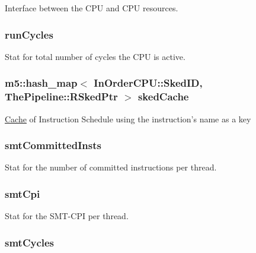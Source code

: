 \label{classInOrderCPU_a2979f0f9689d1d8615cacdc85c65e11f}
Interface between the CPU and CPU resources. \hypertarget{classInOrderCPU_af9addd340a133c2f4add363a3055b019}{
\subsubsection[{runCycles}]{ {\bf runCycles}}}
\label{classInOrderCPU_af9addd340a133c2f4add363a3055b019}
Stat for total number of cycles the CPU is active. \hypertarget{classInOrderCPU_ac3bde2239116735c8de364fb6c64df5f}{
\subsubsection[{skedCache}]{\setlength{\rightskip}{0pt plus 5cm}m5::hash\_\-map$<$ {\bf InOrderCPU::SkedID}, {\bf ThePipeline::RSkedPtr} $>$ {\bf skedCache}}}
\label{classInOrderCPU_ac3bde2239116735c8de364fb6c64df5f}
\hyperlink{classCache}{Cache} of Instruction Schedule using the instruction's name as a key \hypertarget{classInOrderCPU_ab248e5224d70f89e3a901480b5170d8e}{
\subsubsection[{smtCommittedInsts}]{ {\bf smtCommittedInsts}}}
\label{classInOrderCPU_ab248e5224d70f89e3a901480b5170d8e}
Stat for the number of committed instructions per thread. \hypertarget{classInOrderCPU_a1d87e3c89d12e8b8a87c71af10ece177}{
\subsubsection[{smtCpi}]{ {\bf smtCpi}}}
\label{classInOrderCPU_a1d87e3c89d12e8b8a87c71af10ece177}
Stat for the SMT-\/CPI per thread. \hypertarget{classInOrderCPU_a1ad677a4636a45f2352c8e0e7b2e3b05}{
\subsubsection[{smtCycles}]{ {\bf smtCycles}}}

